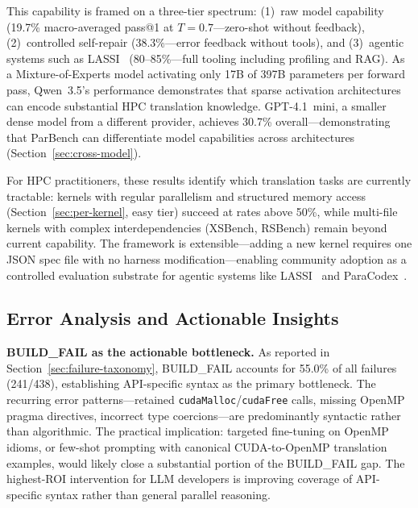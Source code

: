 \documentclass{article}
\newcommand{\buildfail}{\textsc{BUILD\_FAIL}}
\begin{document}
This capability is framed on a three-tier spectrum: (1)~raw model capability (19.7\% macro-averaged pass@1 at $T{=}0.7$---zero-shot without feedback), (2)~controlled self-repair (38.3\%---error feedback without tools), and (3)~agentic systems such as LASSI~\cite{LASSI2024} (80--85\%---full tooling including profiling and RAG). As a Mixture-of-Experts model activating only 17B of 397B parameters per forward pass, Qwen~3.5's performance demonstrates that sparse activation architectures can encode substantial HPC translation knowledge. GPT-4.1~mini, a smaller dense model from a different provider, achieves 30.7\% overall---demonstrating that ParBench can differentiate model capabilities across architectures (Section~\ref{sec:cross-model}). %

For HPC practitioners, these results identify which translation tasks are currently tractable: kernels with regular parallelism and structured memory access (Section~\ref{sec:per-kernel}, easy tier) succeed at rates above 50\%, while multi-file kernels with complex interdependencies (XSBench, RSBench) remain beyond current capability. The framework is extensible---adding a new kernel requires one JSON spec file with no harness modification---enabling community adoption as a controlled evaluation substrate for agentic systems like LASSI~\cite{LASSI2024} and ParaCodex~\cite{ParaCodex2026}.

\subsection{Error Analysis and Actionable Insights}
\label{sec:error-analysis}

\textbf{\buildfail{} as the actionable bottleneck.} As reported in Section~\ref{sec:failure-taxonomy}, \buildfail{} accounts for 55.0\% of all failures (241/438), establishing API-specific syntax as the primary bottleneck. The recurring error patterns---retained \texttt{cudaMalloc}/\texttt{cudaFree} calls, missing OpenMP pragma directives, incorrect type coercions---are predominantly syntactic rather than algorithmic. The practical implication: targeted fine-tuning on OpenMP idioms, or few-shot prompting with canonical CUDA-to-OpenMP translation examples, would likely close a substantial portion of the \buildfail{} gap. The highest-ROI intervention for LLM developers is improving coverage of API-specific syntax rather than general parallel reasoning.
\end{document}
